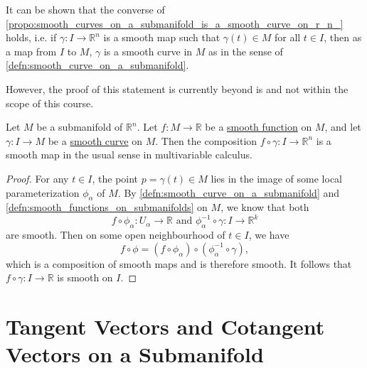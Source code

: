 \documentclass[notoc,notitlepage]{tufte-book}
\begin{document}
\begin{remark}
  It can be shown that the converse of
  \cref{propo:smooth_curves_on_a_submanifold_is_a_smooth_curve_on_r_n_} holds,
  i.e. if $\gamma : I \to \mathbb{R}^n$ is a smooth map such that $\gamma(t) \in
  M$ for all $t \in I$, then as a map from $I$ to $M$, $\gamma$ is a smooth
  curve in $M$ as in the sense of \cref{defn:smooth_curve_on_a_submanifold}.

  However, the proof of this statement is currently beyond is and not within the
  scope of this course.
\end{remark}

\begin{propo}\label{propo:composing_a_smooth_function_and_a_smooth_curve}
  Let $M$ be a submanifold of $\mathbb{R}^n$. Let $f : M \to \mathbb{R}$ be a
  \hyperref[defn:smooth_functions_on_submanifolds]{smooth function} on $M$, and
  let $\gamma : I \to M$ be a
  \hyperref[defn:smooth_curve_on_a_submanifold]{smooth curve} on $M$. Then the
  composition $f \circ \gamma : I \to \mathbb{R}^n$ is a smooth map in the usual
  sense in multivariable calculus.
\end{propo}

\begin{proof}
  For any $t \in I$, the point $p = \gamma(t) \in M$ lies in the image of some
  local parameterization $\phi_\alpha$ of $M$. By
  \cref{defn:smooth_curve_on_a_submanifold} and
  \cref{defn:smooth_functions_on_submanifolds} on $M$, we know that both
  \begin{equation*}
    f \circ \phi_\alpha : U_\alpha \to \mathbb{R} \text{ and } \phi_\alpha^{-1}
    \circ \gamma : I \to \mathbb{R}^k
  \end{equation*}
  are smooth. Then on some open neighbourhood of $t \in I$, we have
  \begin{equation*}
    f \circ \phi = (f \circ \phi_\alpha) \circ (\phi_\alpha^{-1} \circ \gamma),
  \end{equation*}
  which is a composition of smooth maps and is therefore smooth. It follows that
  $f \circ \gamma : I \to \mathbb{R}$ is smooth on $I$.
\end{proof}
 

\section{Tangent Vectors and Cotangent Vectors on a Submanifold}%
\label{sec:tangent_vectors_and_cotangent_vectors_on_a_submanifold}
\end{document}
